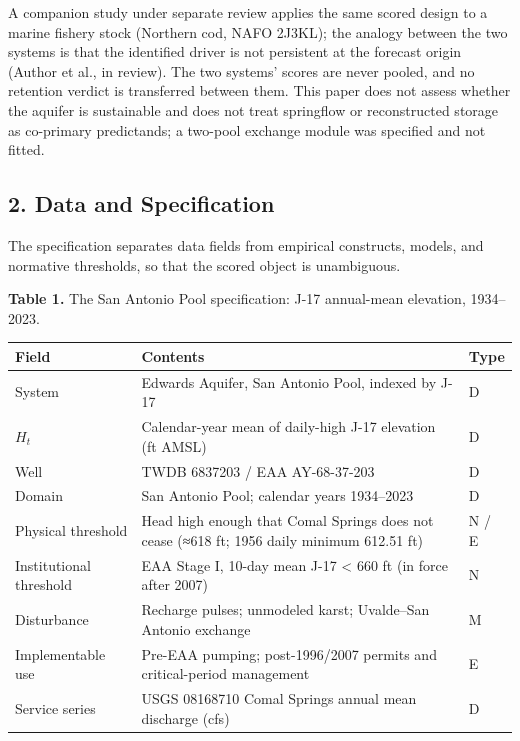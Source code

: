 \documentclass[11pt]{article}
\begin{document}
A companion study under separate review applies the same scored design
to a marine fishery stock (Northern cod, NAFO 2J3KL); the analogy
between the two systems is that the identified driver is not persistent
at the forecast origin (Author et al., in review). The two systems'
scores are never pooled, and no retention verdict is transferred between
them. This paper does not assess whether the aquifer is sustainable and
does not treat springflow or reconstructed storage as co-primary
predictands; a two-pool exchange module was specified and not fitted.

\subsection{2. Data and Specification}\label{data-and-specification}

The specification separates data fields from empirical constructs,
models, and normative thresholds, so that the scored object is
unambiguous.

\textbf{Table 1.} The San Antonio Pool specification: J-17 annual-mean
elevation, 1934--2023.

{\def\LTcaptype{none} %
\begin{longtable}[]{@{}
  >{\raggedright\arraybackslash}p{}
  >{\raggedright\arraybackslash}p{}
  >{\raggedright\arraybackslash}p{}@{}}
\toprule\noalign{}
\begin{minipage}[b]{\linewidth}\raggedright
Field
\end{minipage} & \begin{minipage}[b]{\linewidth}\raggedright
Contents
\end{minipage} & \begin{minipage}[b]{\linewidth}\raggedright
Type
\end{minipage} \\
\midrule\noalign{}
\endhead
\bottomrule\noalign{}
\endlastfoot
System & Edwards Aquifer, San Antonio Pool, indexed by J-17 & D \\
\(H_t\) & Calendar-year mean of daily-high J-17 elevation (ft AMSL) &
D \\
Well & TWDB 6837203 / EAA AY-68-37-203 & D \\
Domain & San Antonio Pool; calendar years 1934--2023 & D \\
Physical threshold & Head high enough that Comal Springs does not cease
(≈618 ft; 1956 daily minimum 612.51 ft) & N / E \\
Institutional threshold & EAA Stage I, 10-day mean J-17 \textless{} 660
ft (in force after 2007) & N \\
Disturbance & Recharge pulses; unmodeled karst; Uvalde--San Antonio
exchange & M \\
Implementable use & Pre-EAA pumping; post-1996/2007 permits and
critical-period management & E \\
Service series & USGS 08168710 Comal Springs annual mean discharge (cfs)
& D \\
\end{longtable}
}
\end{document}
